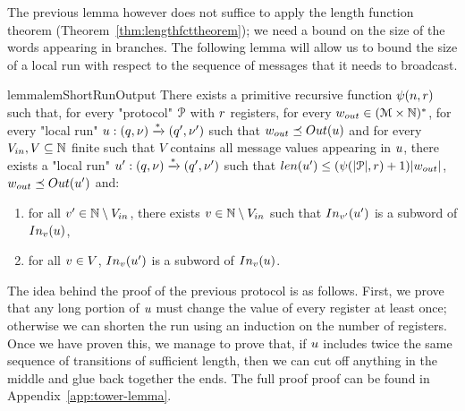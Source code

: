 The previous lemma however does not suffice to apply the length function theorem (Theorem~\ref{thm:lengthfcttheorem}); we need a bound on the size of the words appearing in branches. The following lemma will allow us to bound the size of a local run with respect to the sequence of messages that it needs to broadcast. 


\begin{restatable}{lemma}{lemShortRunOutput}
	\label{lem:short-run-for-output}
	There exists a primitive recursive function $\psi(n,r)$ such that, for every "protocol" $\mathcal{P}$ with $r$ registers, for every $w_{out} \in (\mathcal{M}\times \mathbb{N})^*$, for every "local run" $u: (q, \nu) \xrightarrow{*} (q', \nu')$ such that $w_{out} \subword \Output{\localrun}$ and for every $V_{in}, V \subseteq \mathbb{N}$ finite such that $V$ contains all message values appearing in $u$, there exists a "local run" $u': (q, \nu) \xrightarrow{*} (q', \nu')$ such that $\length{\localrun'} \leq (\towerfun(\size{\prot}, \regnum)+1) \size{w_{out}}$, $w_{out} \subword \Output{\localrun'}$ and:
	
	\begin{enumerate}
		\item for all $v' \in \mathbb{N} \setminus V_{in}$, there exists $v \in \mathbb{N}\setminus V_{in}$ such that $\vinput{\aval'}{\localrun'}$ is a subword of $\vinput{\aval}{\localrun}$,
		\item for all $v \in V$, $\vinput{\aval}{\localrun'}$ is a subword of $\vinput{\aval}{\localrun}$. 
	\end{enumerate}
\end{restatable}

The idea behind the proof of the previous protocol is as follows. First, we prove that any long portion of $u$ must change the value of every register at least once; otherwise we can shorten the run using an induction on the number of registers. Once we have proven this, we manage to prove that, if $u$ includes twice the same sequence of transitions of sufficient length, then we can cut off anything in the middle and glue back together the ends. The full proof proof can be found in Appendix~\ref{app:tower-lemma}.

